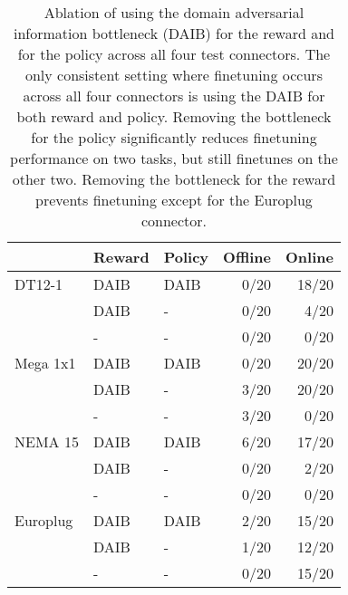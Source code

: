 
\renewcommand{\arraystretch}{1.4}
\setlength{\arrayrulewidth}{0.1mm}
\setlength{\tabcolsep}{3pt}

\begin{table}[]
\centering
\begin{tabular}{l|ll|rr}
         & Reward & Policy & \multicolumn{1}{l}{Offline} & \multicolumn{1}{l}{Online} \\ \hline \hline
DT12-1   & DAIB   & DAIB   & 0/20                           & 18/20                         \\
         & DAIB   & -      & 0/20                           & 4/20                          \\
         & -      & -      & 0/20                           & 0/20                          \\  \hline
Mega 1x1 & DAIB   & DAIB   & 0/20                           & 20/20                         \\
         & DAIB   & -      & 3/20                           & 20/20                         \\
         & -      & -      & 3/20                           & 0/20                          \\  \hline
NEMA 15  & DAIB   & DAIB   & 6/20                           & 17/20                         \\
         & DAIB   & -      & 0/20                           & 2/20                          \\
         & -      & -      & 0/20                           & 0/20                          \\  \hline
Europlug & DAIB   & DAIB   & 2/20                           & 15/20                         \\
         & DAIB   & -      & 1/20                           & 12/20                         \\
         & -      & -      & 0/20                           & 15/20                        
\end{tabular}
\caption{Ablation of using the domain adversarial information bottleneck (DAIB) for the reward and for the policy across all four test connectors. The only consistent setting where finetuning occurs across all four connectors is using the DAIB for both reward and policy. Removing the bottleneck for the policy significantly reduces finetuning performance on two tasks, but still finetunes on the other two. Removing the bottleneck for the reward prevents finetuning except for the Europlug connector. }
\end{table}
